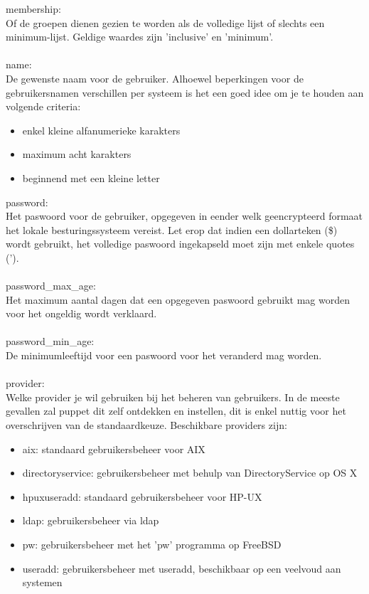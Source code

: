 %
membership:\\
Of de groepen dienen gezien te worden als de volledige lijst of slechts een minimum-lijst. Geldige waardes zijn 'inclusive' en 'minimum'.\\\\
%
name:\\
De gewenste naam voor de gebruiker. Alhoewel beperkingen voor de gebruikersnamen verschillen per systeem is het een goed idee om je te houden aan volgende criteria:
\begin{itemize}
\item enkel kleine alfanumerieke karakters
\item maximum acht karakters
\item beginnend met een kleine letter
\end{itemize}
%
password:\\
Het paswoord voor de gebruiker, opgegeven in eender welk geencrypteerd formaat het lokale besturingssysteem vereist. Let erop dat indien een dollarteken (\$) wordt gebruikt, het volledige paswoord ingekapseld moet zijn met enkele quotes (').\\\\
%
password\_max\_age:\\
Het maximum aantal dagen dat een opgegeven paswoord gebruikt mag worden voor het ongeldig wordt verklaard.\\\\
%
password\_min\_age:\\
De minimumleeftijd voor een paswoord voor het veranderd mag worden.\\\\
%
provider:\\
Welke provider je wil gebruiken bij het beheren van  gebruikers. In de meeste gevallen zal puppet dit zelf ontdekken en instellen, dit is enkel nuttig voor het overschrijven van de standaardkeuze. Beschikbare providers zijn:
\begin{itemize}
\item aix: standaard gebruikersbeheer voor AIX
\item directoryservice: gebruikersbeheer met behulp van DirectoryService op OS X
\item hpuxuseradd: standaard gebruikersbeheer voor HP-UX
\item ldap: gebruikersbeheer via ldap
\item pw: gebruikersbeheer met het 'pw' programma op FreeBSD
\item useradd: gebruikersbeheer met useradd, beschikbaar op een veelvoud aan systemen
\end{itemize}
